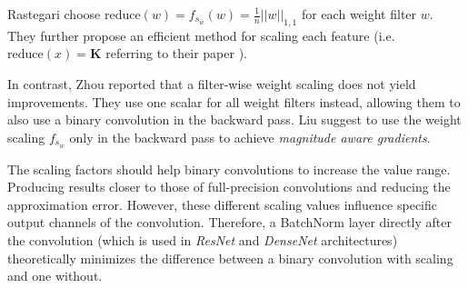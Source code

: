 \documentclass[10pt,twocolumn,letterpaper]{article}
\newcommand{\architecture}[1]{\emph{#1}}
\begin{document}
Rastegari \etal\cite{Rastegari2016} choose $\mathrm{reduce}(w) = f_{s_w}(w) = \frac{1}{n}||w||_{1,1}$ for each weight filter $w$.
They further propose an efficient method for scaling each feature (i.e.~$\mathrm{reduce}(x) = \mathbf{K}$ referring to their paper \cite{Rastegari2016}).

In contrast, Zhou \etal\cite{Zhou2016} reported that a filter-wise weight scaling does not yield improvements.
They use one scalar for all weight filters instead, allowing them to also use a binary convolution in the backward pass.
Liu \etal\cite{Liu_2018_ECCV} suggest to use the weight scaling $f_{s_w}$ only in the backward pass to achieve \emph{magnitude aware gradients}.

The scaling factors should help binary convolutions to increase the value range.
Producing results closer to those of full-precision convolutions and reducing the approximation error.
However, these different scaling values influence specific output channels of the convolution.
Therefore, a BatchNorm \cite{ioffe2015batch} layer directly after the convolution (which is used in \architecture{ResNet} and \architecture{DenseNet} architectures) theoretically minimizes the difference between a binary convolution with scaling and one without.
\end{document}
